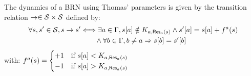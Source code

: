 \begin{definition}\label{def:dynamics}
The dynamics of a BRN using Thomas' parameters is given by the transition relation $\rightarrow \in \mathcal{S} \times \mathcal{S}$ defined by:
\begin{align*}
  \forall s, s' \in \mathcal{S}, s \rightarrow s' &\Longleftrightarrow \exists a \in \Gamma, {s[a]} \notin K_{a, \mathsf{Res}_{a}(s)} \wedge {s'[a]} = {s[a]} + f^a(s) \\
    & \qquad \wedge \forall b \in \Gamma, b \neq a \Rightarrow {s[b]} = {s'[b]}
\end{align*}
with: $f^a(s) = 
  \begin{cases}
    +1 & \text{if } {s[a]} < K_{a, \mathsf{Res}_{a}(s)} \\
    -1 & \text{if } {s[a]} > K_{a, \mathsf{Res}_{a}(s)} \\
  \end{cases}$
\begin{comment}
Let $s$ be a state of a BRN using Thomas' parameters $(\IG, K)$ where $\IG = (\Gamma, E_+, E_-)$.
The state that succeeds to $s$ is given by the indeterministic function $f(s)$:
\begin{align*}
  f(s)  & = s' \Leftrightarrow \exists a \in \Gamma,
    \GRNget{s'}{a} = f^a(s) \wedge
    \forall b \in \Gamma, b \neq a, \GRNget{s}{b} = \GRNget{s'}{b}
    \quad\text{, with}\\
  f^a(s) & =
  \begin{cases}
    \GRNget{s}{a} + 1 & \text{if } \GRNget{s}{a} < K_{a,A,B} \\%
    \GRNget{s}{a} & \text{if } \GRNget{s}{a} \in K_{a,A,B} \\ %
    \GRNget{s}{a} - 1 & \text{if } \GRNget{s}{a} > K_{a,A,B} %
  \end{cases}
\quad\text{, where $A,B=\GRNres{a}{s}$.}
\end{align*}
\end{comment}
\end{definition}

